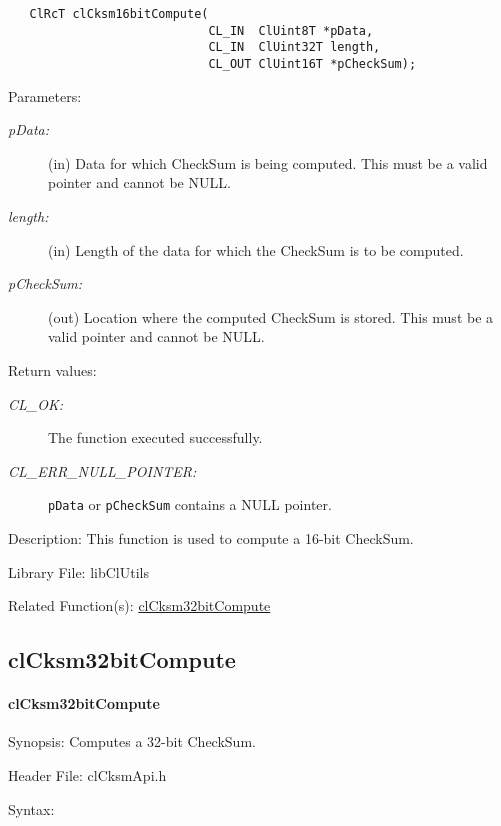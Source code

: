 \begin{flushleft}
\begin{Desc}
\footnotesize\begin{verbatim}   ClRcT clCksm16bitCompute(
              				CL_IN  ClUint8T *pData,
              				CL_IN  ClUint32T length,
              				CL_OUT ClUint16T *pCheckSum);
\end{verbatim}
\normalsize
\end{Desc}
\begin{Desc}
\item[Parameters:]
\begin{description}
\item[{\em p\-Data:}](in) Data for which CheckSum is being computed. This must be a valid pointer and cannot be NULL.
\item[{\em length:}](in) Length of the data for which the CheckSum is to be computed.
\item[{\em p\-Check\-Sum:}](out) Location where the computed CheckSum is stored. This must be a valid pointer and cannot be NULL.\end{description}
\end{Desc}
\begin{Desc}
\item[Return values:]
\begin{description}
\item[{\em CL\_\-OK:}]The function executed successfully. 
\item[{\em CL\_\-ERR\_\-NULL\_\-POINTER:}]{\tt{pData}} or {\tt{pCheckSum}} contains a NULL pointer.\end{description}
\end{Desc}
\begin{Desc}
\item[Description:]This function is used to compute a 16-bit Check\-Sum.\end{Desc}
\begin{Desc}
\item[Library File:]lib\-Cl\-Utils\end{Desc}
\begin{Desc}
\item[Related Function(s):]\hyperlink{pagecksm102}{cl\-Cksm32bit\-Compute} \end{Desc}
\newpage

\subsection{clCksm32bitCompute}
\hypertarget{pagecksm102}{}\paragraph{cl\-Cksm32bit\-Compute}\label{pagecksm102}
\begin{Desc}
\item[Synopsis:]Computes a 32-bit Check\-Sum.\end{Desc}
\begin{Desc}
\item[Header File:]clCksmApi.h\end{Desc}
\begin{Desc}
\item[Syntax:]


\end{Desc}
\end{flushleft}
